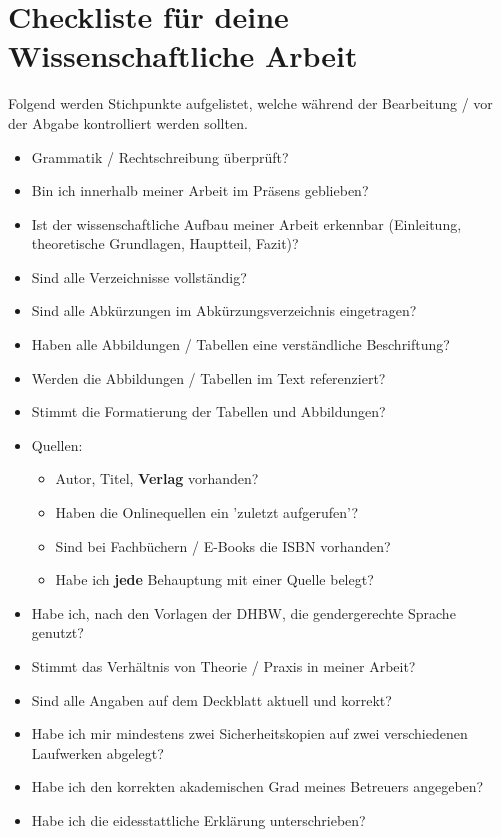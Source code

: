 
\chapter{Checkliste für deine Wissenschaftliche Arbeit}

Folgend werden Stichpunkte aufgelistet, welche während der Bearbeitung / vor der Abgabe kontrolliert werden sollten.

\begin{itemize}
    \item Grammatik / Rechtschreibung überprüft?
    \item Bin ich innerhalb meiner Arbeit im Präsens geblieben?
    \item Ist der wissenschaftliche Aufbau meiner Arbeit erkennbar (Einleitung, theoretische Grundlagen, Hauptteil, Fazit)?
    \item Sind alle Verzeichnisse vollständig?
    \item Sind alle Abkürzungen im Abkürzungsverzeichnis eingetragen?
    \item Haben alle Abbildungen / Tabellen eine verständliche Beschriftung?
    \item Werden die Abbildungen / Tabellen im Text referenziert?
    \item Stimmt die Formatierung der Tabellen und Abbildungen?
    \item Quellen:
    \begin{itemize}
        \item Autor, Titel, \textbf{Verlag} vorhanden?
        \item Haben die Onlinequellen ein 'zuletzt aufgerufen'?
        \item Sind bei Fachbüchern / E-Books die ISBN vorhanden?
        \item Habe ich \textbf{jede} Behauptung mit einer Quelle belegt?
    \end{itemize}
    \item Habe ich, nach den Vorlagen der DHBW, die gendergerechte Sprache genutzt?
    \item Stimmt das Verhältnis von Theorie / Praxis in meiner Arbeit?
    \item Sind alle Angaben auf dem Deckblatt aktuell und korrekt?
    \item Habe ich mir mindestens zwei Sicherheitskopien auf zwei verschiedenen Laufwerken abgelegt?
    \item Habe ich den korrekten akademischen Grad meines Betreuers angegeben?
    \item Habe ich die eidesstattliche Erklärung unterschrieben?

\end{itemize}